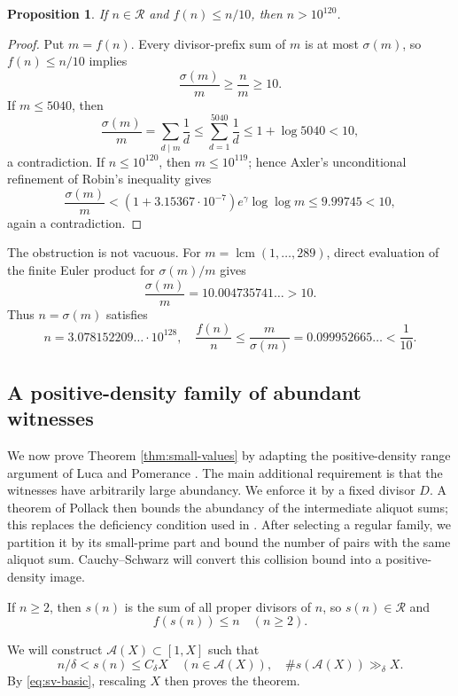 \documentclass[11pt,letterpaper,reqno]{amsart}
\numberwithin{equation}{section}
\newtheorem{proposition}[theorem]{Proposition}
\theoremstyle{remark}
\newcommand{\Rcal}{\mathcal{R}}
\newcommand{\1}{\mathbf 1}
\DeclareMathOperator{\lcm}{lcm}
\renewcommand{\leq}{\leqslant}
\renewcommand{\geq}{\geqslant}
\begin{document}
\begin{proposition}
If $n\in\Rcal$ and $f(n)\leq n/10$, then $n>10^{120}$.
\end{proposition}

\begin{proof}
Put $m=f(n)$. Every divisor-prefix sum of $m$ is at most $\sigma(m)$,
so $f(n)\leq n/10$ implies
\[
 \frac{\sigma(m)}m\geq\frac nm\geq10.
\]
If $m\leq5040$, then
\[
 \frac{\sigma(m)}m=\sum_{d\mid m}\frac1d
 \leq\sum_{d=1}^{5040}\frac1d
 \leq1+\log5040<10,
\]
a contradiction. If $n\leq10^{120}$, then $m\leq10^{119}$; hence
Axler's unconditional refinement of Robin's inequality
\cite[Corollary~2]{AxlerRobin} gives
\[
 \frac{\sigma(m)}m
 <(1+3.15367\cdot10^{-7})e^\gamma\log\log m
 \leq9.99745<10,
\]
again a contradiction.
\end{proof}

The obstruction is not vacuous. For
$m=\lcm(1,\ldots,289)$, direct evaluation of the finite Euler product for
$\sigma(m)/m$ gives
\[
 \frac{\sigma(m)}m=10.004735741\ldots>10.
\]
Thus $n=\sigma(m)$ satisfies
\[
 n=3.078152209\ldots\cdot10^{128},
 \quad
 \frac{f(n)}n\leq\frac m{\sigma(m)}
 =0.099952665\ldots<\frac1{10}.
\]


\subsection{A positive-density family of abundant witnesses}

We now prove Theorem \ref{thm:small-values} by adapting the positive-density
range argument of Luca and Pomerance \cite{LucaPomerance}. The main
additional requirement is that the witnesses have arbitrarily large
abundancy. We enforce it by a fixed divisor $D$. A theorem of Pollack
\cite{Pollack} then bounds the abundancy of the intermediate aliquot sums;
this replaces the deficiency condition used in \cite{LucaPomerance}.
After selecting a regular family, we partition it by its small-prime part
and bound the number of pairs with the same aliquot sum. Cauchy--Schwarz
will convert this collision bound into a positive-density image.

If $n\geq2$, then $s(n)$ is the sum of all proper divisors of $n$, so
$s(n)\in\Rcal$ and
\begin{equation}\label{eq:sv-basic}
 f(s(n))\leq n \quad(n\geq2).
\end{equation}


We will construct $\mathcal{A}(X)\subset[1,X]$ such that
\[
 n/\delta<s(n)\leq C_\delta X\quad(n\in\mathcal{A}(X)),
 \quad \#s(\mathcal{A}(X))\gg_\delta X.
\]
By \eqref{eq:sv-basic}, rescaling $X$ then proves the theorem.
\end{document}
